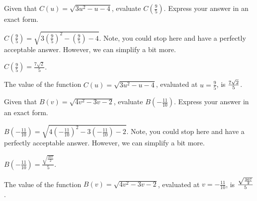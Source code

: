 \begin{shuffle}
\begin{exercise}
Given that $C(u)=\sqrt{3 u^2-u-4}$, evaluate $C\left(\frac{9}{5}\right)$. Express your answer in an exact form.
\begin{solution}
\begin{hint}
$C\left(\frac{9}{5}\right)=\sqrt{3 (\frac{9}{5})^2-(\frac{9}{5})-4}$. Note, you could stop here and have a perfectly acceptable answer. However, we can simplify a bit more. 
\end{hint}
\begin{hint}
$C\left(\frac{9}{5}\right)=\frac{7 \sqrt{2}}{5}$.
\end{hint}
The value of the function $C(u)=\sqrt{3 u^2-u-4}$, evaluated at $u=\frac{9}{5}$, is ${\frac{7 \sqrt{2}}{5}}$.
\end{solution}
\end{exercise}

\begin{exercise}
Given that $B(v)=\sqrt{4 v^2-3 v-2}$, evaluate $B\left(-\frac{11}{10}\right)$. Express your answer in an exact form.
\begin{solution}
\begin{hint}
$B\left(-\frac{11}{10}\right)=\sqrt{4 (-\frac{11}{10})^2-3 (-\frac{11}{10})-2}$. Note, you could stop here and have a perfectly acceptable answer. However, we can simplify a bit more. 
\end{hint}
\begin{hint}
$B\left(-\frac{11}{10}\right)=\frac{\sqrt{\frac{307}{2}}}{5}$.
\end{hint}
The value of the function $B(v)=\sqrt{4 v^2-3 v-2}$, evaluated at $v=-\frac{11}{10}$, is ${\frac{\sqrt{\frac{307}{2}}}{5}}$.
\end{solution}
\end{exercise}


\end{shuffle}




